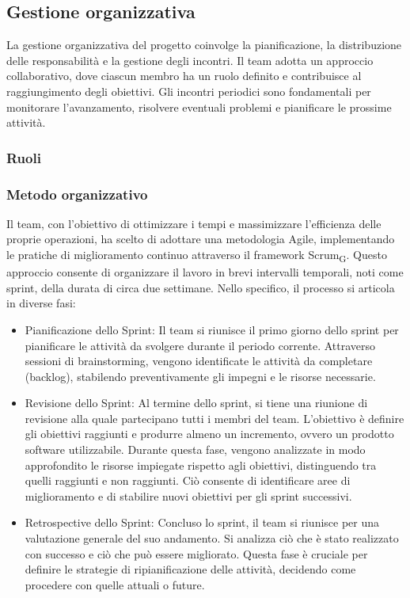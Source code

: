 \documentclass{article}
\begin{document}
\subsection{Gestione organizzativa}
La gestione organizzativa del progetto coinvolge la pianificazione, la distribuzione delle responsabilità e la gestione degli incontri. Il team adotta un approccio collaborativo, dove ciascun membro ha un ruolo definito e contribuisce al raggiungimento degli obiettivi. Gli incontri periodici sono fondamentali per monitorare l'avanzamento, risolvere eventuali problemi e pianificare le prossime attività.
\subsubsection{Ruoli}
\subsubsection{Metodo organizzativo}
Il team, con l'obiettivo di ottimizzare i tempi e massimizzare l'efficienza delle proprie operazioni, ha scelto di adottare una metodologia Agile, implementando le pratiche di miglioramento continuo attraverso il framework Scrum\textsubscript{G}. Questo approccio consente di organizzare il lavoro in brevi intervalli temporali, noti come sprint, della durata di circa due settimane. Nello specifico, il processo si articola in diverse fasi:
\begin{itemize}
    \item Pianificazione dello Sprint: Il team si riunisce il primo giorno dello sprint per pianificare le attività da svolgere durante il periodo corrente. Attraverso sessioni di brainstorming, vengono identificate le attività da completare (backlog), stabilendo preventivamente gli impegni e le risorse necessarie.
    \item Revisione dello Sprint: Al termine dello sprint, si tiene una riunione di revisione alla quale partecipano tutti i membri del team. L'obiettivo è definire gli obiettivi raggiunti e produrre almeno un incremento, ovvero un prodotto software utilizzabile. Durante questa fase, vengono analizzate in modo approfondito le risorse impiegate rispetto agli obiettivi, distinguendo tra quelli raggiunti e non raggiunti. Ciò consente di identificare aree di miglioramento e di stabilire nuovi obiettivi per gli sprint successivi.
    \item Retrospective dello Sprint: Concluso lo sprint, il team si riunisce per una valutazione generale del suo andamento. Si analizza ciò che è stato realizzato con successo e ciò che può essere migliorato. Questa fase è cruciale per definire le strategie di ripianificazione delle attività, decidendo come procedere con quelle attuali o future.
\end{itemize}
\end{document}

